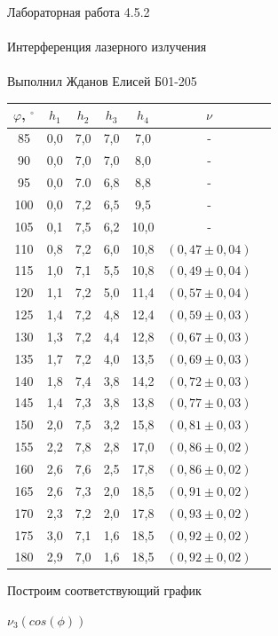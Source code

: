 \documentclass{astroedu-lab}
\begin{document}
\begin{problem}{\huge Лабораторная работа 4.5.2\\\\Интерференция лазерного излучения\\\\Выполнил Жданов Елисей Б01-205}
\begin{center}
\begin{tabular}{|c|c|c|c|c|c|c|}
\hline 
$\varphi$, $^\circ$ & $h_1$ & $h_2$ & $h_3$ & $h_4$ & $\nu$ \\
\hline
85  & 0,0 & 7,0 & 7,0 & 7,0 & - \\
90  & 0,0 & 7,0 & 7,0 & 8,0 & - \\
95  & 0,0 & 7.0 & 6,8 & 8,8 & - \\
100 & 0,0 & 7,2 & 6,5 & 9,5 & - \\
105 & 0,1 & 7,5 & 6,2 & 10,0 & - \\
110 & 0,8 & 7,2 & 6,0 & 10,8 & $(0,47 \pm 0,04)$ \\
115 & 1,0 & 7,1 & 5,5 & 10,8 & $(0,49 \pm 0,04)$ \\
120 & 1,1 & 7,2 & 5,0 & 11,4 & $(0,57 \pm 0,04)$ \\
125 & 1,4 & 7,2 & 4,8 & 12,4 & $(0,59 \pm 0,03)$ \\
130 & 1,3 & 7,2 & 4,4 & 12,8 & $(0,67 \pm 0,03)$ \\
135 & 1,7 & 7,2 & 4,0 & 13,5 & $(0,69 \pm 0,03)$ \\
140 & 1,8 & 7,4 & 3,8 & 14,2 & $(0,72 \pm 0,03)$ \\
145 & 1,4 & 7,3 & 3,8 & 13,8 & $(0,77 \pm 0,03)$ \\
150 & 2,0 & 7,5 & 3,2 & 15,8 & $(0,81 \pm 0,03)$ \\
155 & 2,2 & 7,8 & 2,8 & 17,0 & $(0,86 \pm 0,02)$ \\
160 & 2,6 & 7,6 & 2,5 & 17,8 & $(0,86 \pm 0,02)$ \\
165 & 2,6 & 7,3 & 2,0 & 18,5 & $(0,91 \pm 0,02)$ \\
170 & 2,3 & 7,2 & 2,0 & 17,8 & $(0,93 \pm 0,02)$ \\
175 & 3,0 & 7,1 & 1,6 & 18,5 & $(0,92 \pm 0,02)$ \\
180 & 2,9 & 7,0 & 1,6 & 18,5 & $(0,92 \pm 0,02)$ \\
\hline
\end{tabular}
\end{center}

\newpage

Построим соответствующий график

\begin{center}
	\Large $\nu_3(cos(\phi))$
\end{center}


\end{problem}
\end{document}
